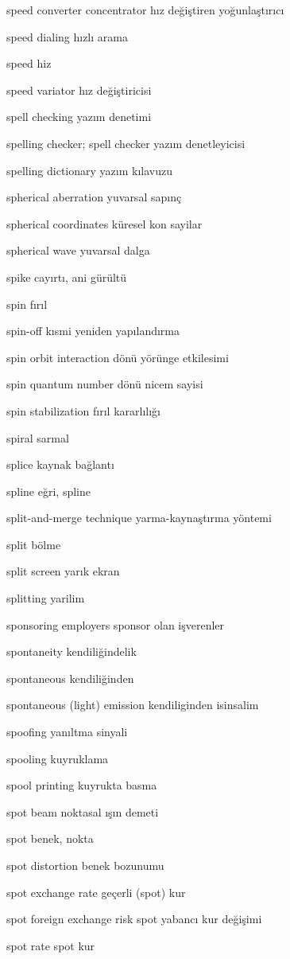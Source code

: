 \documentclass[12pt,fleqn]{article}\usepackage{../../common}
\begin{document}
speed converter concentrator hız değiştiren yoğunlaştırıcı

speed dialing hızlı arama

speed hiz

speed variator hız değiştiricisi

spell checking yazım denetimi

spelling checker; spell checker yazım denetleyicisi

spelling dictionary yazım kılavuzu

spherical aberration yuvarsal sapınç

spherical coordinates küresel kon sayilar

spherical wave yuvarsal dalga

spike cayırtı, ani gürültü

spin fırıl

spin-off kısmi yeniden yapılandırma

spin orbit interaction dönü yörünge etkilesimi

spin quantum number dönü nicem sayisi

spin stabilization fırıl kararlılığı

spiral sarmal

splice kaynak bağlantı

spline eğri, spline

split-and-merge technique yarma-kaynaştırma yöntemi

split bölme

split screen yarık ekran

splitting yarilim

sponsoring employers sponsor olan işverenler

spontaneity kendiliğindelik

spontaneous kendiliğinden

spontaneous (light) emission kendiliginden isinsalim

spoofing yanıltma sinyali

spooling kuyruklama

spool printing kuyrukta basma

spot beam noktasal ışın demeti

spot benek, nokta

spot distortion benek bozunumu

spot exchange rate geçerli (spot) kur

spot foreign exchange risk spot yabancı kur değişimi

spot rate spot kur
\end{document}

